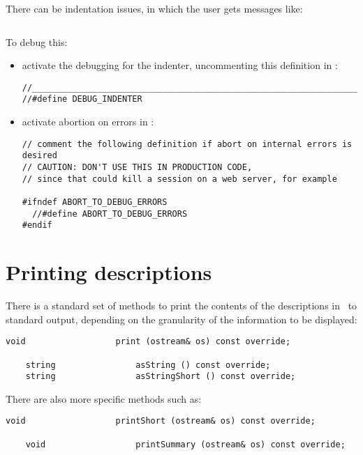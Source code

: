 There can be indentation issues, in which the user gets messages like:
\begin{lstlisting}[language=Terminal]
% ### Indentation has become negative: -1
\end{lstlisting}

To debug this:
\begin{itemize}
\item activate the debugging for the indenter, uncommenting this definition in :
\begin{lstlisting}[language=CPlusplus]
//______________________________________________________________________________
//#define DEBUG_INDENTER
\end{lstlisting}

\item activate abortion on errors in :
\begin{lstlisting}[language=CPlusPlus]
// comment the following definition if abort on internal errors is desired
// CAUTION: DON'T USE THIS IN PRODUCTION CODE,
// since that could kill a session on a web server, for example

#ifndef ABORT_TO_DEBUG_ERRORS
  //#define ABORT_TO_DEBUG_ERRORS
#endif
\end{lstlisting}


\end{itemize}


\section{Printing descriptions}

There is a standard set of methods to print the contents of the descriptions in \mf\ to standard output, depending on the granularity of the information to be displayed:
\begin{lstlisting}[language=CPlusPlus]
    void                  print (ostream& os) const override;

    string                asString () const override;
    string                asStringShort () const override;
\end{lstlisting}

There are also more specific methods such as:
\begin{lstlisting}[language=CPlusPlus]
    void                  printShort (ostream& os) const override;

    void                  printSummary (ostream& os) const override;
\end{lstlisting}

